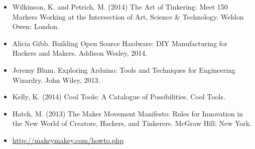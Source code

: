 \documentclass{../fal_assignment}
\begin{document}
\begin{itemize}
    \item Wilkinson, K. and Petrich, M. (2014) The Art of Tinkering: Meet 150 Markers Working at the Intersection of Art, Science \& Technology. Weldon Owen: London.
    \item Alicia Gibb. Building Open Source Hardware: DIY Manufacturing for Hackers and Makers. Addison Wesley, 2014. 
    \item Jeremy Blum. Exploring Arduino: Tools and Techniques for Engineering Wizardry. John Wiley, 2013. 
    \item Kelly, K. (2014) Cool Tools: A Catalogue of Possibilities. Cool Tools.
    \item Hatch, M. (2013) The Maker Movement Manifesto: Rules for Innovation in the New World of Creators, Hackers, and Tinkerers. McGraw Hill: New York.
    \item \url{http://makeymakey.com/howto.php}
\end{itemize}
\end{document}
